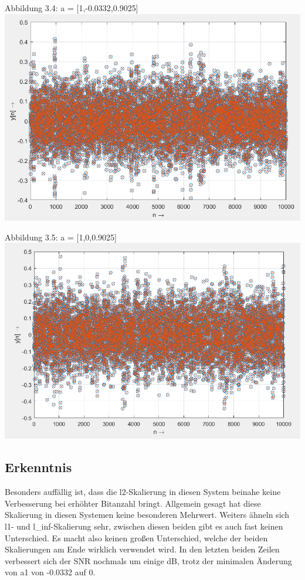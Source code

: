 \begin{center}
Abbildung 3.4: a = [1,-0.0332,0.9025]\\
\includegraphics[scale=0.7]{../Tab4_4_14B_l1.PNG}
\end{center}

\newpage

\begin{center}
Abbildung 3.5: a = [1,0,0.9025]\\
\includegraphics[scale=0.7]{../Tab4_5_14B_l1.PNG}
\end{center}

\subsection{Erkenntnis}

Besonders auffällig ist, dass die l2-Skalierung in diesen System beinahe keine Verbesserung bei erhöhter Bitanzahl bringt. Allgemein gesagt hat diese Skalierung in diesen Systemen keine besonderen Mehrwert. Weiters ähneln sich l1- und l\_inf-Skalierung sehr, zwischen diesen beiden gibt es auch fast keinen Unterschied. Es macht also keinen großen Unterschied, welche der beiden Skalierungen am Ende wirklich verwendet wird. In den letzten beiden Zeilen verbessert sich der SNR nochmals um einige dB, trotz der minimalen Änderung von a1 von -0.0332 auf 0.

